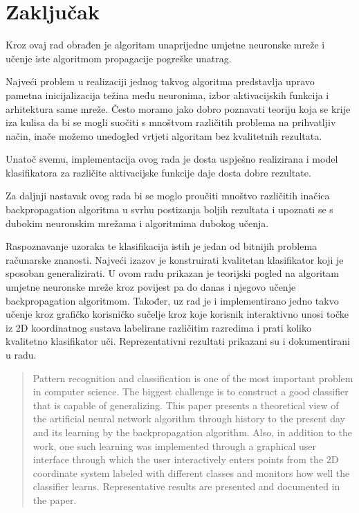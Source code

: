 \documentclass[times, utf8, zavrsni]{fer}
\begin{document}
\chapter{Zaključak}
Kroz ovaj rad obrađen je algoritam unaprijedne umjetne neuronske mreže i učenje iste algoritmom propagacije pogreške unatrag.

Najveći problem u realizaciji jednog takvog algoritma predstavlja upravo pametna inicijalizacija težina među neuronima, izbor aktivacijskih funkcija i arhitektura same mreže. Često moramo jako dobro poznavati teoriju koja se krije iza kulisa da bi se mogli suočiti s mnoštvom različitih problema na prihvatljiv način, inače možemo unedogled vrtjeti algoritam bez kvalitetnih rezultata.

Unatoč svemu, implementacija ovog rada je dosta uspješno realizirana i model klasifikatora za različite aktivacijske funkcije daje dosta dobre rezultate.

\bigskip
Za daljnji nastavak ovog rada bi se moglo proučiti mnoštvo različitih inačica backpropagation algoritma u svrhu postizanja boljih rezultata i upoznati se s dubokim neuronskim mrežama i algoritmima dubokog učenja.




\begin{sazetak}
Raspoznavanje uzoraka te klasifikacija istih je jedan od bitnijih problema računarske znanosti. Najveći izazov je konstruirati kvalitetan klasifikator koji je sposoban generalizirati. U ovom radu prikazan je teorijski pogled na algoritam umjetne neuronske mreže kroz povijest pa do danas i njegovo učenje backpropagation algoritmom. Također, uz rad je i implementirano jedno takvo učenje kroz grafičko korisničko sučelje kroz koje korisnik interaktivno unosi točke iz 2D koordinatnog sustava labelirane različitim razredima i prati koliko kvalitetno klasifikator uči. Reprezentativni rezultati prikazani su i dokumentirani u radu.

\end{sazetak}

\begin{abstract}
Pattern recognition and classification is one of the most important problem in computer science. The biggest challenge is to construct a good classifier that is capable of generalizing. This paper presents a theoretical view of the artificial neural network algorithm through history to the present day and its learning by the backpropagation algorithm. Also, in addition to the work, one such learning was implemented through a graphical user interface through which the user interactively enters points from the 2D coordinate system labeled with different classes and monitors how well the classifier learns. Representative results are presented and documented in the paper.

\end{abstract}
\end{document}
